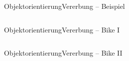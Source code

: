 \documentclass[xelatex,aspectratio=169]{beamer}
\begin{document}
\begin{frame}{Objektorientierung}{Vererbung -- Beispiel}
    \inputminted[firstline=1, lastline=11, linenos]{python}{src/class_inheritance.py}
\end{frame}

\begin{frame}{Objektorientierung}{Vererbung -- Bike I}
    \inputminted[firstline=0, lastline=12]{python}{src/class_bike_inherited.py}
\end{frame}

\begin{frame}{Objektorientierung}{Vererbung -- Bike II}
    \inputminted[firstline=15, lastline=26]{python}{src/class_bike_inherited.py}
\end{frame}
\end{document}
